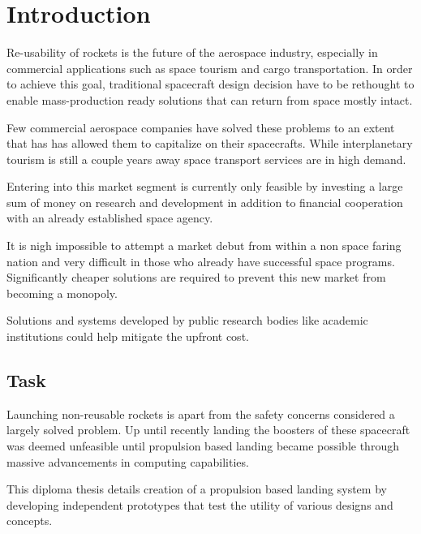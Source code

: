 \chapter{Introduction}

Re-usability of rockets is the future of the aerospace industry, especially in commercial applications such as space tourism and cargo transportation. In order to achieve this goal, traditional spacecraft design decision have to be rethought to enable mass-production ready solutions that can return from space mostly intact. 

Few commercial aerospace companies have solved these problems to an extent that has has allowed them to capitalize on their spacecrafts. While interplanetary tourism is still a couple years away space transport services are in high demand.

Entering into this market segment is currently only feasible by investing a large sum of money on research and development in addition to financial cooperation with an already established space agency.

It is nigh impossible to attempt a market debut from within a non space faring nation and very difficult in those who already have successful space programs. Significantly cheaper solutions are required to prevent this new market from becoming a monopoly.

Solutions and systems developed by public research bodies like academic institutions could help mitigate the upfront cost.

\section{Task}

Launching non-reusable rockets is apart from the safety concerns considered a largely solved problem. Up until recently landing the boosters of these spacecraft was deemed unfeasible until propulsion based landing became possible through massive advancements in computing capabilities. 

This diploma thesis details creation of a propulsion based landing system by developing independent prototypes that test the utility of various designs and concepts.



\section{}